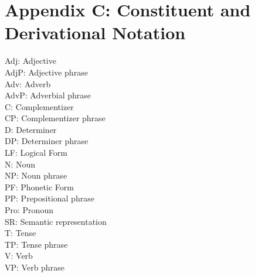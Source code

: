 \documentclass{article}
\begin{document}
\section*{Appendix C: Constituent and Derivational Notation}
Adj: Adjective \\
AdjP: Adjective phrase \\
Adv: Adverb \\
AdvP: Adverbial phrase \\
C: Complementizer \\
CP: Complementizer phrase \\
D: Determiner \\
DP: Determiner phrase \\
LF: Logical Form \\
N: Noun \\
NP: Noun phrase \\
PF: Phonetic Form \\
PP: Prepositional phrase \\
Pro: Pronoun \\
SR: Semantic representation \\
T: Tense \\
TP: Tense phrase \\
V: Verb \\
VP: Verb phrase \\
\end{document}
